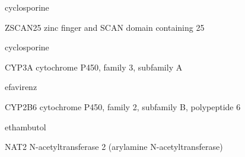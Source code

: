 \documentclass{resume} %
\begin{document}
\begin{rSection}{ cyclosporine }
\begin{rSubsection}{ ZSCAN25 }{ zinc finger and SCAN domain containing 25 }{}{}
\end{rSubsection}

\end{rSection}\begin{rSection}{ cyclosporine }
\item[]
\begin{rSubsection}{ CYP3A }{ cytochrome P450, family 3, subfamily A }{}{}
\item[]


\end{rSubsection}

\end{rSection}\begin{rSection}{ efavirenz }
\item[]
\begin{rSubsection}{ CYP2B6 }{ cytochrome P450, family 2, subfamily B, polypeptide 6 }{}{}
\item[]


\end{rSubsection}

\end{rSection}\begin{rSection}{ ethambutol }
\item[]
\begin{rSubsection}{ NAT2 }{ N-acetyltransferase 2 (arylamine N-acetyltransferase) }{}{}
\item[]


\end{rSubsection}


\end{rSection}
\end{document}
